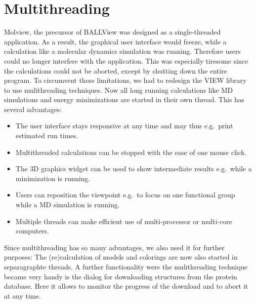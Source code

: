 \section{Multithreading}\label{mthread}
Molview, the precursor of BALLView was designed as a single-threaded application. 
As a result, the graphical user interface would freeze, while a calculation like a 
molecular dynamics simulation was running.
Therefore users could no longer interfere with the application.
This was especially tiresome since the calculations could not be aborted, except by 
shutting down the entire program.
To circumvent these limitations, we had to redesign the VIEW library to use mulithreading 
techniques.
Now all long running calculations like MD simulations and energy minimizations are 
started in their own thread.
This has several advantages:
\begin{itemize}
\item The user interface stays responsive at any time and may thus e.g.\ print estimated run times.
\item Multithreaded calculations can be stopped with the ease of one mouse click.
\item The 3D graphics widget can be used to show intermediate results e.g.\ while a minimization is running.
\item Users can reposition the viewpoint e.g.\ to focus on one functional group while a MD simulation is running.
\item Multiple threads can make efficient use of multi-processor or multi-core computers.
\end{itemize}
Since multithreading has so many advantages, we also used it for further purposes:
The (re)calculation of models and colorings are now also started in separagraphte threads.
A further functionality were the mulithreading technique became very handy is the dialog for 
downloading structures from the protein database. 
Here it allows to monitor the progress of the download and to abort it at any time.

